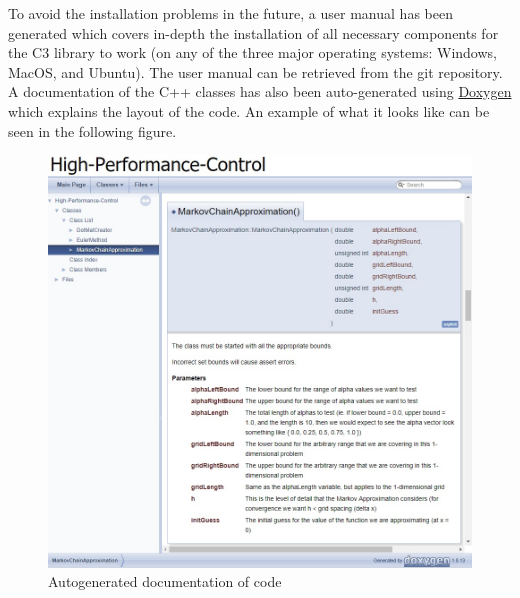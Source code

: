 \documentclass[11pt,draftd]{article}
\begin{document}
\noindent To avoid the installation problems in the future, a user manual has been generated which covers in-depth the installation of all necessary components for the C3 library to work (on any of the three major operating systems: Windows, MacOS, and Ubuntu). The user manual can be retrieved from the git repository. A documentation of the C++ classes has also been auto-generated using \href{https://www.stack.nl/~dimitri/doxygen/}{Doxygen} which explains the layout of the code. An example of what it looks like can be seen in the following figure. \\
\newpage
\begin{figure}[h!]
	\centering
	\label{doxygen-documentation}
	\includegraphics[scale = 0.63]{doxygen-example}
	\caption{Autogenerated documentation of code}
\end{figure}
\[\]
\end{document}
